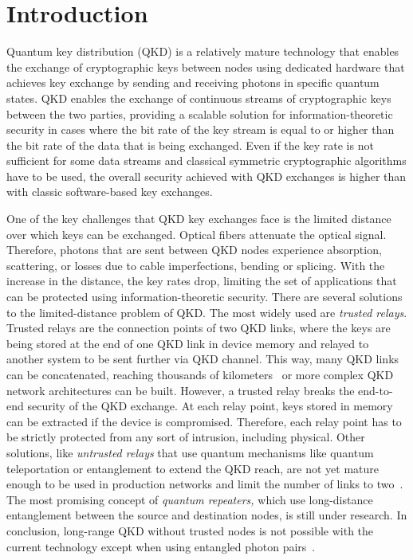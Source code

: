 \documentclass[futureinternet,article,submit,moreauthors]{Definitions/mdpi}
\begin{document}
\section{Introduction}

Quantum key distribution (QKD) is a relatively mature technology that enables the exchange of cryptographic keys between nodes using dedicated hardware that achieves key exchange by sending and receiving photons in specific quantum states. QKD enables the exchange of continuous streams of cryptographic keys between the two parties, providing a scalable solution for information-theoretic security in cases where the bit rate of the key stream is equal to or higher than the bit rate of the data that is being exchanged. Even if the key rate is not sufficient for some data streams and classical symmetric cryptographic algorithms have to be used, the overall security achieved with QKD exchanges is higher than with classic software-based key exchanges.

One of the key challenges that QKD key exchanges face is the limited distance over which keys can be exchanged. Optical fibers attenuate the optical signal. Therefore, photons that are sent between QKD nodes experience absorption, scattering, or losses due to cable imperfections, bending or splicing. With the increase in the distance, the key rates drop, limiting the set of applications that can be protected using information-theoretic security. There are several solutions to the limited-distance problem of QKD. The most widely used are \emph{trusted relays}. Trusted relays are the connection points of two QKD links, where the keys are being stored at the end of one QKD link in device memory and relayed to another system to be sent further via QKD channel. This way, many QKD links can be concatenated, reaching thousands of kilometers~\cite{zhang_large_2018} or more complex QKD network architectures can be built. However, a trusted relay breaks the end-to-end security of the QKD exchange. At each relay point, keys stored in memory can be extracted if the device is compromised. Therefore, each relay point has to be strictly protected from any sort of intrusion, including physical. Other solutions, like \emph{untrusted relays} that use quantum mechanisms like quantum teleportation or entanglement to extend the QKD reach, are not yet mature enough to be used in production networks and limit the number of links to two~\cite{cao_evolution_2022}. The most promising concept of \emph{quantum repeaters,} which use long-distance entanglement between the source and destination nodes, is still under research. In conclusion, long-range QKD without trusted nodes is not possible with the current technology except when using entangled photon pairs~\cite{huttner_long-range_2022}.
\end{document}
